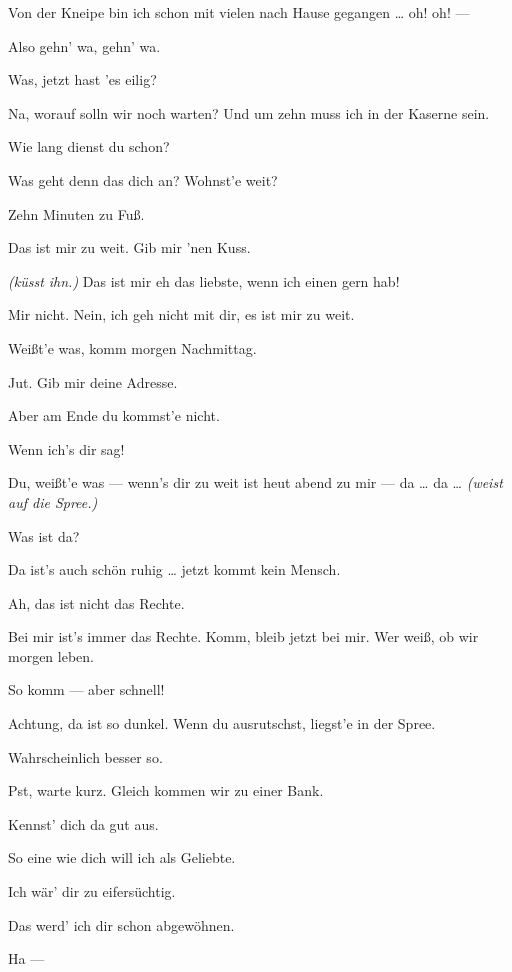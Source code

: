 \documentclass[
	final,
	a4paper,
	ngerman,
	mpinclude = true, %
	twoside = true,
	open = right,
	cleardoublepage = plain,
	DIV = 13,
	BCOR = 1cm,
	titlepage = firstiscover,
	]{scrbook}
\newcommand{\direction}[1]{\textit{(#1)}}
\newcommand{\thecharacter}[1]{\textup{\textsc{#1}}\xspace}
\newcommand{\thenutte}{\thecharacter{Leocadia}}
\newcommand{\thesoldatin}{\thecharacter{Franziska}}
\newcommand{\character}[1]{\item[#1:]}
\newcommand{\nutte}{\character{\thenutte}}
\newcommand{\soldatin}{\character{\thesoldatin}}
\begin{document}
\begin{play}
	\nutte
	Von der Kneipe bin ich schon mit vielen nach Hause gegangen \ldots{} oh! oh! ---

	\soldatin
	Also gehn' wa, gehn' wa.

	\nutte
	Was, jetzt hast 'es eilig?

	\soldatin
	Na, worauf solln wir noch warten? Und um zehn muss ich in der Kaserne sein.

	\nutte
	Wie lang dienst du schon?

	\soldatin
	Was geht denn das dich an? Wohnst'e weit?

	\nutte
	Zehn Minuten zu Fuß.

	\soldatin
	Das ist mir zu weit. Gib mir 'nen Kuss.

	\nutte
	\direction{küsst ihn.} Das ist mir eh das liebste, wenn ich einen gern hab!

	\soldatin
	Mir nicht. Nein, ich geh nicht mit dir, es ist mir zu weit.

	\nutte
	Weißt'e was, komm morgen Nachmittag.

	\soldatin
	Jut. Gib mir deine Adresse.

	\nutte
	Aber am Ende du kommst'e nicht.

	\soldatin
	Wenn ich's dir sag!

	\nutte
	Du, weißt'e was --- wenn's dir zu weit ist heut abend zu mir --- da \ldots{} da \ldots{} \direction{weist auf die Spree.}

	\soldatin
	Was ist da?

	\nutte
	Da ist's auch schön ruhig \ldots{} jetzt kommt kein Mensch.

	\soldatin
	Ah, das ist nicht das Rechte.

	\nutte
	Bei mir ist's immer das Rechte. Komm, bleib jetzt bei mir. Wer weiß, ob wir morgen leben.

	\soldatin
	So komm --- aber schnell!

	\nutte
	Achtung, da ist so dunkel. Wenn du ausrutschst, liegst'e in der Spree.

	\soldatin
	Wahrscheinlich besser so.

	\nutte
	Pst, warte kurz. Gleich kommen wir zu einer Bank.

	\soldatin
	Kennst' dich da gut aus.

	\nutte
	So eine wie dich will ich als Geliebte.

	\soldatin
	Ich wär' dir zu eifersüchtig.

	\nutte
	Das werd' ich dir schon abgewöhnen.

	\soldatin
	Ha ---


\end{play}
\end{document}
